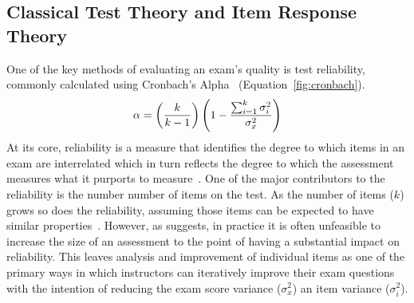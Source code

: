 \documentclass[authorversion,nonacm]{acmart}
\begin{document}
\subsection{Classical Test Theory and Item Response Theory}

One of the key methods of evaluating an exam's quality is test reliability,
commonly calculated using Cronbach's Alpha~\cite{cronbach1951coefficient}
(Equation~\ref{fig:cronbach}). 
\begin{equation}
    \alpha =\left({k \over k-1}\right)\left(1-{\sum _{i=1}^{k}\sigma
    _{i}^{2} \over \sigma _{x}^{2}}\right)
\end{equation}\label{fig:cronbach}
At its core, reliability is a measure that identifies the degree to which
items in an exam are interrelated which in turn reflects the degree to which the
assessment measures what it purports to measure~\cite{lord2008statistical,
ebel1967relation, ebel1972essentials}.  
One of the major contributors to the reliability is the number number of items on
the test. As the number of items ($k$) grows so does the reliability, assuming those items can be expected to have
similar properties~\cite{ebel1967relation, allen2001introduction, ebel1972essentials}.
However, as \citet{ebel1967relation} suggests, in practice it is often
unfeasible to increase the size of an assessment to the point of having a
substantial impact on reliability. This leaves 
analysis and improvement of individual items as one of the primary ways in
which instructors can iteratively improve their exam questions with the
intention of reducing the exam score variance ($\sigma^2_x$) an item variance 
($\sigma^2_i$).
\end{document}
